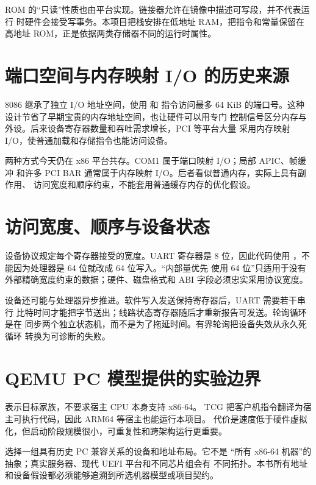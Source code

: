ROM 的“只读”性质也由平台实现。链接器允许在镜像中描述可写段，并不代表运行
时硬件会接受写事务。本项目把栈安排在低地址 RAM，把指令和常量保留在高地址
ROM，正是依据两类存储器不同的运行时属性。

\section{端口空间与内存映射 I/O 的历史来源}

8086 继承了独立 I/O 地址空间，使用  和  指令访问最多
64 KiB 的端口号。这种设计节省了早期宝贵的内存地址空间，也让硬件可以用专门
控制信号区分内存与外设。后来设备寄存器数量和吞吐需求增长，PCI 等平台大量
采用内存映射 I/O，使普通加载和存储指令也能访问设备。

两种方式今天仍在 x86 平台共存。COM1 属于端口映射 I/O；局部 APIC、帧缓冲
和许多 PCI BAR 通常属于内存映射 I/O。后者看似普通内存，实际上具有副作用、
访问宽度和顺序约束，不能套用普通缓存内存的优化假设。

\section{访问宽度、顺序与设备状态}

设备协议规定每个寄存器接受的宽度。UART 寄存器是 8 位，因此代码使用
，不能因为处理器是 64 位就改成 64 位写入。“内部量优先
使用 64 位”只适用于没有外部精确宽度约束的数据；硬件、磁盘格式和 ABI
字段必须忠实采用协议宽度。

设备还可能与处理器异步推进。软件写入发送保持寄存器后，UART 需要若干串行
比特时间才能把字节送出；线路状态寄存器随后才重新报告可发送。轮询循环是在
同步两个独立状态机，而不是为了拖延时间。有界轮询把设备失效从永久死循环
转换为可诊断的失败。

\section{QEMU PC 模型提供的实验边界}

 表示目标家族，不要求宿主 CPU 本身支持 x86-64。
TCG 把客户机指令翻译为宿主可执行代码，因此 ARM64 等宿主也能运行本项目。
代价是速度低于硬件虚拟化，但启动阶段规模很小，可重复性和跨架构运行更重要。

 选择一组具有历史 PC 兼容关系的设备和地址布局。它不是
“所有 x86-64 机器”的抽象；真实服务器、现代 UEFI 平台和不同芯片组会有
不同拓扑。本书所有地址和设备假设都必须能够追溯到所选机器模型或项目契约。
